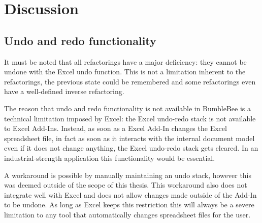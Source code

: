 %
%
%
%

\newpage

\section{Discussion}

\subsection{Undo and redo functionality}

It must be noted that all refactorings have a major deficiency: they cannot be undone with the Excel undo function.
This is not a limitation inherent to the refactorings, the previous state could be remembered and some refactorings even have a well-defined inverse refactoring.

The reason that undo and redo functionality is not available in BumbleBee is a technical limitation imposed by Excel: the Excel undo-redo stack is not available to Excel Add-Ins.
Instead, as soon as a Excel Add-In changes the Excel spreadsheet file, in fact as soon as it interacts with the internal document model even if it does not change anything, the Excel undo-redo stack gets cleared.
In an industrial-strength application this functionality would be essential.

A workaround is possible by manually maintaining an undo stack, however this was deemed outside of the scope of this thesis.
This workaround also does not integrate well with Excel and does not allow changes made outside of the Add-In to be undone. 
As long as Excel keeps this restriction this will always be a severe limitation to any tool that automatically changes spreadsheet files for the user.

